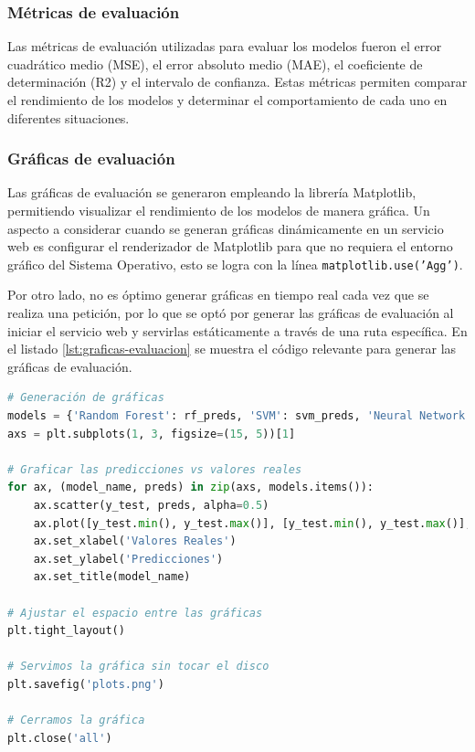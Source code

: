 \subsubsection{Métricas de evaluación}
Las métricas de evaluación utilizadas para evaluar los modelos fueron el error
cuadrático medio (MSE), el error absoluto medio (MAE), el coeficiente de
determinación (R2) y el intervalo de confianza. Estas métricas permiten
comparar el rendimiento de los modelos y determinar el comportamiento de cada
uno en diferentes situaciones.

\subsubsection{Gráficas de evaluación}
Las gráficas de evaluación se generaron empleando la librería Matplotlib,
permitiendo visualizar el rendimiento de los modelos de manera gráfica. Un aspecto
a considerar cuando se generan gráficas dinámicamente en un servicio web es
configurar el renderizador de Matplotlib para que no requiera el entorno gráfico
del Sistema Operativo, esto se logra con la línea \texttt{matplotlib.use('Agg')}.

Por otro lado, no es óptimo generar gráficas en tiempo real cada vez que se
realiza una petición, por lo que se optó por generar las gráficas de evaluación
al iniciar el servicio web y servirlas estáticamente a través de una ruta
específica. En el listado \ref{lst:graficas-evaluacion} se muestra el código
relevante para generar las gráficas de evaluación.

\begin{lstlisting}[language=python, caption={Generación de gráficas de evaluación}, label={lst:graficas-evaluacion}]
# Generación de gráficas
models = {'Random Forest': rf_preds, 'SVM': svm_preds, 'Neural Network': nn_preds}
axs = plt.subplots(1, 3, figsize=(15, 5))[1]

# Graficar las predicciones vs valores reales
for ax, (model_name, preds) in zip(axs, models.items()):
    ax.scatter(y_test, preds, alpha=0.5)
    ax.plot([y_test.min(), y_test.max()], [y_test.min(), y_test.max()], 'k--', lw=2)
    ax.set_xlabel('Valores Reales')
    ax.set_ylabel('Predicciones')
    ax.set_title(model_name)

# Ajustar el espacio entre las gráficas
plt.tight_layout()

# Servimos la gráfica sin tocar el disco
plt.savefig('plots.png')

# Cerramos la gráfica
plt.close('all')
\end{lstlisting}

